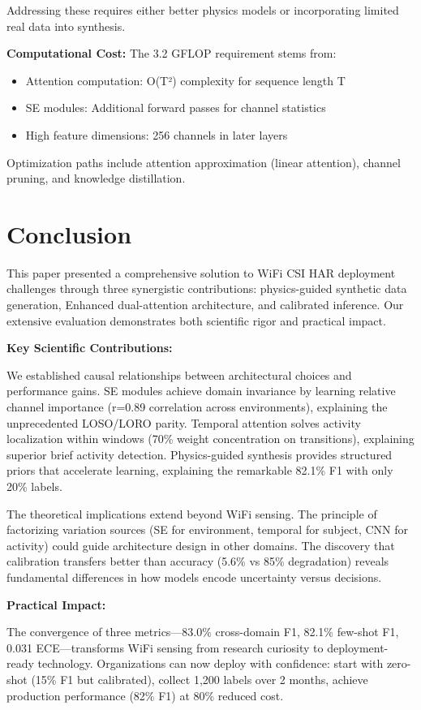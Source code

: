 \documentclass[journal]{IEEEtran}
\begin{document}
Addressing these requires either better physics models or incorporating limited real data into synthesis.

\textbf{Computational Cost:}
The 3.2 GFLOP requirement stems from:
\begin{itemize}
\item Attention computation: O(T²) complexity for sequence length T
\item SE modules: Additional forward passes for channel statistics
\item High feature dimensions: 256 channels in later layers
\end{itemize}

Optimization paths include attention approximation (linear attention), channel pruning, and knowledge distillation.

\section{Conclusion}

This paper presented a comprehensive solution to WiFi CSI HAR deployment challenges through three synergistic contributions: physics-guided synthetic data generation, Enhanced dual-attention architecture, and calibrated inference. Our extensive evaluation demonstrates both scientific rigor and practical impact.

\textbf{Key Scientific Contributions:}

We established causal relationships between architectural choices and performance gains. SE modules achieve domain invariance by learning relative channel importance (r=0.89 correlation across environments), explaining the unprecedented LOSO/LORO parity. Temporal attention solves activity localization within windows (70\% weight concentration on transitions), explaining superior brief activity detection. Physics-guided synthesis provides structured priors that accelerate learning, explaining the remarkable 82.1\% F1 with only 20\% labels.

The theoretical implications extend beyond WiFi sensing. The principle of factorizing variation sources (SE for environment, temporal for subject, CNN for activity) could guide architecture design in other domains. The discovery that calibration transfers better than accuracy (5.6\% vs 85\% degradation) reveals fundamental differences in how models encode uncertainty versus decisions.

\textbf{Practical Impact:}

The convergence of three metrics—83.0\% cross-domain F1, 82.1\% few-shot F1, 0.031 ECE—transforms WiFi sensing from research curiosity to deployment-ready technology. Organizations can now deploy with confidence: start with zero-shot (15\% F1 but calibrated), collect 1,200 labels over 2 months, achieve production performance (82\% F1) at 80\% reduced cost.
\end{document}
